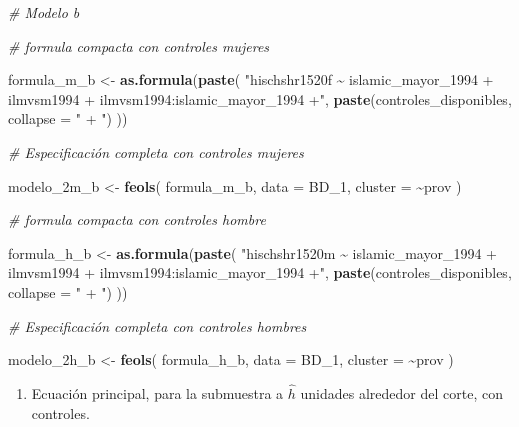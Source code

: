 \documentclass[
]{article}
\newenvironment{Shaded}{\begin{snugshade}}{\end{snugshade}}
\newcommand{\AttributeTok}[1]{\textcolor[rgb]{0.13,0.29,0.53}{#1}}
\newcommand{\CommentTok}[1]{\textcolor[rgb]{0.56,0.35,0.01}{\textit{#1}}}
\newcommand{\FunctionTok}[1]{\textcolor[rgb]{0.13,0.29,0.53}{\textbf{#1}}}
\newcommand{\NormalTok}[1]{#1}
\newcommand{\OtherTok}[1]{\textcolor[rgb]{0.56,0.35,0.01}{#1}}
\newcommand{\SpecialCharTok}[1]{\textcolor[rgb]{0.81,0.36,0.00}{\textbf{#1}}}
\newcommand{\StringTok}[1]{\textcolor[rgb]{0.31,0.60,0.02}{#1}}
\providecommand{\tightlist}{%
  \setlength{\itemsep}{0pt}\setlength{\parskip}{0pt}}
\begin{document}
\begin{Shaded}
\begin{Highlighting}[]
\CommentTok{\# Modelo b}

\CommentTok{\# formula compacta con controles mujeres}

\NormalTok{formula\_m\_b }\OtherTok{\textless{}{-}} \FunctionTok{as.formula}\NormalTok{(}\FunctionTok{paste}\NormalTok{(}
  \StringTok{"hischshr1520f \textasciitilde{} islamic\_mayor\_1994 + ilmvsm1994 + ilmvsm1994:islamic\_mayor\_1994 +"}\NormalTok{,}
  \FunctionTok{paste}\NormalTok{(controles\_disponibles, }\AttributeTok{collapse =} \StringTok{" + "}\NormalTok{)}
\NormalTok{))}

\CommentTok{\# Especificación completa con controles mujeres}

\NormalTok{modelo\_2m\_b }\OtherTok{\textless{}{-}} \FunctionTok{feols}\NormalTok{(}
\NormalTok{  formula\_m\_b,}
  \AttributeTok{data =}\NormalTok{ BD\_1,}
  \AttributeTok{cluster =} \SpecialCharTok{\textasciitilde{}}\NormalTok{prov}
\NormalTok{)}

\CommentTok{\# formula compacta con controles hombre}

\NormalTok{formula\_h\_b }\OtherTok{\textless{}{-}} \FunctionTok{as.formula}\NormalTok{(}\FunctionTok{paste}\NormalTok{(}
  \StringTok{"hischshr1520m \textasciitilde{} islamic\_mayor\_1994 + ilmvsm1994 + ilmvsm1994:islamic\_mayor\_1994 +"}\NormalTok{,}
  \FunctionTok{paste}\NormalTok{(controles\_disponibles, }\AttributeTok{collapse =} \StringTok{" + "}\NormalTok{)}
\NormalTok{))}

\CommentTok{\# Especificación completa con controles hombres}

\NormalTok{modelo\_2h\_b }\OtherTok{\textless{}{-}} \FunctionTok{feols}\NormalTok{(}
\NormalTok{  formula\_h\_b,}
  \AttributeTok{data =}\NormalTok{ BD\_1,}
  \AttributeTok{cluster =} \SpecialCharTok{\textasciitilde{}}\NormalTok{prov}
\NormalTok{)}
\end{Highlighting}
\end{Shaded}

\begin{enumerate}
\def\labelenumi{\alph{enumi})}
\setcounter{enumi}{2}
\tightlist
\item
  Ecuación principal, para la submuestra a \(\hat{h}\) unidades
  alrededor del corte, con controles.
\end{enumerate}
\end{document}
